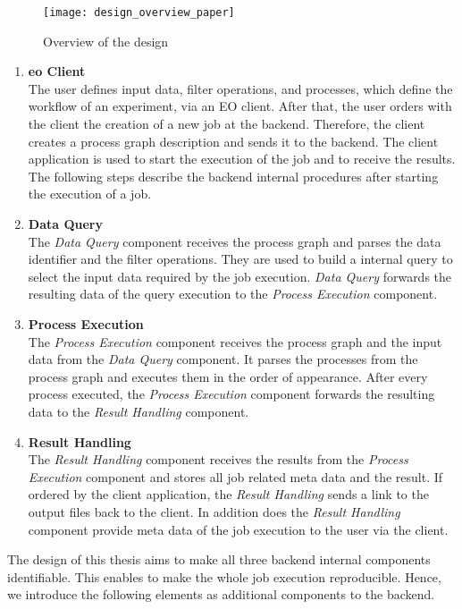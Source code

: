 \documentclass[draft,final]{vutinfth} %
\begin{document}
\begin{figure}[h]
	\centering
	\texttt{[image: design\_overview\_paper]}
	\caption{Overview of the design}
	\label{fig:overview} 
\end{figure}


 \begin{enumerate}
	\item \textbf{\gls{eo} Client} \\
	The user defines input data, filter operations, and processes, which define the workflow of an experiment, via an EO client. After that, the user orders with the client the creation of a new job at the backend. Therefore, the client creates a process graph description and sends it to the backend. The client application is used to start the execution of the job and to receive the results. The following steps describe the backend internal procedures after starting the execution of a job.
	\item \textbf{Data Query} \\ 
	The \textit{Data Query} component receives the process graph and parses the data identifier and the filter operations. They are used to build a internal query to select the input data required by the job execution. \textit{Data Query} forwards the resulting data of the query execution to the \textit{Process Execution} component.
	\item \textbf{Process Execution} \\
	The \textit{Process Execution} component receives the process graph and the input data from the \textit{Data Query} component. It parses the processes from the process graph and executes them in the order of appearance. After every process executed, the \textit{Process Execution} component forwards the resulting data to the \textit{Result Handling} component.   
	\item \textbf{Result Handling} \\ 
	The \textit{Result Handling} component receives the results from the \textit{Process Execution} component and stores all job related meta data and the result. If ordered by the client application, the \textit{Result Handling} sends a link to the output files back to the client. In addition does the \textit{Result Handling} component provide meta data of the job execution to the user via the client. 
\end{enumerate}

The design of this thesis aims to make all three backend internal components identifiable. This enables to make the whole job execution reproducible. Hence, we introduce the following elements as additional components to the backend.
\end{document}
